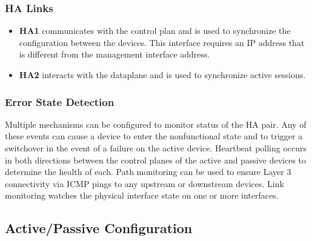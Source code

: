 \subsubsection{HA Links}
\begin{itemize}
    \item \textbf{HA1} communicates with the control plan and is used to synchronize the configuration between the devices.
    This interface requires an IP address that is different from the management interface address.
    \item \textbf{HA2} interacts with the dataplane and is used to synchronize active sessions.
\end{itemize}

\subsubsection{Error State Detection}
Multiple mechanisms can be configured to monitor status of the HA pair.
Any of these events can cause a device to enter the nonfunctional state and to trigger a switchover in the event of a failure on the active device.
\newline
Heartbeat polling occurs in both directions between the control planes of the active and passive devices to determine the health of each.
\newline
Path monitoring can be used to ensure Layer 3 connectivity via ICMP pings to any upstream or downstream devices. 
\newline
Link monitoring watches the physical interface state on one or more interfaces.

\subsection{Active/Passive Configuration}
